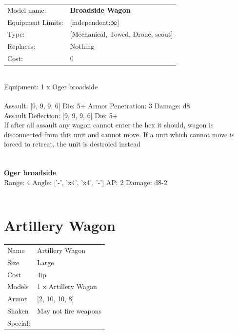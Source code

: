 \noindent
\begin{tabular}{ll}
Model name: &{\bf Broadside Wagon } \\
Equipment Limits: &[independent:∞] \\
Type: &[Mechanical, Towed, Drone, scout] \\
Replaces: &Nothing \\
Cost: & 0\\
\end{tabular}
\ \\
Equipment: 1 x Oger broadside \\
\ \\
Assault: [9, 9, 9, 6] Die: 5+ Armor Penetration: 3 Damage: d8 \\
Assault Deflection: [9, 9, 9, 6] Die: 5+\\
\indent If after all assault any wagon cannot enter the hex it should, wagon is disconnected from this unit and cannot move. If a unit which cannot move is forced to retreat, the unit is destroied instead\\ 
 
\ \\

\ \\
{\bf Oger broadside } \\



Range: 4  Angle: ['-', 'x4', 'x4', '-'] AP: 2 Damage: d8-2 \\




 
\ \\













\clearpage

\section{ Artillery Wagon }

\begin{tabular}{ll}
  Name & Artillery Wagon \\
  Size & Large\\
  Cost & 4ip\\
  Models & 1 x Artillery Wagon\\
  Armor & [2, 10, 10, 8]\\
  Shaken & May not fire weapons\\
  Special: \\
\end{tabular}

